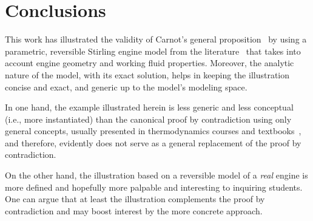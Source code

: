 \section{Conclusions}

    This     work     has     illustrated     the     validity     of      Carnot's      general
    proposition~\cite{1897-ThurstonRH-Wiley} by using a parametric, reversible  Stirling  engine
    model from the literature~\cite{2012-ChengCH+YangHS-ApEnergy} that takes into account engine
    geometry and working fluid properties. Moreover, the analytic nature of the model, with  its
    exact solution, helps in keeping the illustration concise and exact, and generic up  to  the
    model's modeling space.

    In one hand, the example illustrated herein is less generic and less conceptual (i.e.,  more
    instantiated) than the canonical proof by contradiction using only general concepts,  usually
    presented  in   thermodynamics   courses   and   textbooks~\cite{2013-CengelYA+BolesMA-AMGH,
    2002-MoranMJ+ShapiroHN-LTC, 1986-JonesJB+HawkinsGA-Wiley}, and therefore, evidently does not
    serve as a general replacement of the proof by contradiction.

    On the other hand, the illustration based on a reversible model of a \emph{real}  engine  is
    more defined and hopefully more palpable and interesting  to  inquiring  students.  One  can
    argue that at least the illustration complements the proof by contradiction  and  may  boost
    interest by the more concrete approach.


